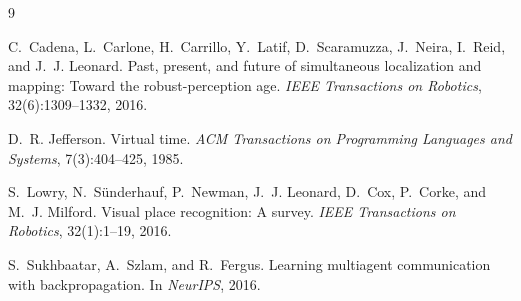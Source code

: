 \documentclass{article}
\begin{document}
\begin{thebibliography}{9}

C.~Cadena, L.~Carlone, H.~Carrillo, Y.~Latif, D.~Scaramuzza,
J.~Neira, I.~Reid, and J.~J. Leonard.
\newblock Past, present, and future of simultaneous localization and
mapping: Toward the robust-perception age.
\newblock \emph{IEEE Transactions on Robotics}, 32(6):1309--1332, 2016.

D.~R. Jefferson.
\newblock Virtual time.
\newblock \emph{ACM Transactions on Programming Languages and Systems},
7(3):404--425, 1985.

S.~Lowry, N.~S\"underhauf, P.~Newman, J.~J. Leonard, D.~Cox,
P.~Corke, and M.~J. Milford.
\newblock Visual place recognition: A survey.
\newblock \emph{IEEE Transactions on Robotics}, 32(1):1--19, 2016.

S.~Sukhbaatar, A.~Szlam, and R.~Fergus.
\newblock Learning multiagent communication with backpropagation.
\newblock In \emph{NeurIPS}, 2016.

\end{thebibliography}
\end{document}
